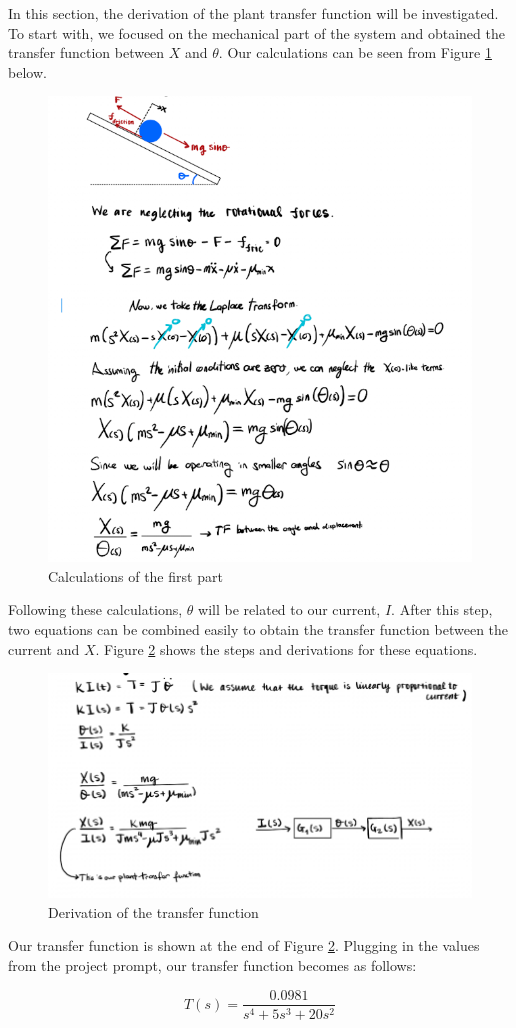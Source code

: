 In this section, the derivation of the plant transfer function will be investigated. To start with, we focused on the mechanical part of the system and obtained the transfer function between $X$ and $\theta$. Our calculations can be seen from Figure \ref{fig:mechanical_transfer} below. \\

\begin{figure}[H]
    \centering
    \includegraphics[width=.9\textwidth]{images/mechanical_transfer.png}
    \caption{Calculations of the first part}
    \label{fig:mechanical_transfer}
\end{figure}

\newpage

Following these calculations, $\theta$ will be related to our current, $I$. After this step, two equations can be combined easily to obtain the transfer function between the current and $X$. Figure \ref{fig:final_transfer} shows the steps and derivations for these equations. 

\begin{figure}[H]
    \centering
    \includegraphics[width=.9\textwidth]{images/second_transfer.png}
    \caption{Derivation of the transfer function}
    \label{fig:final_transfer}
\end{figure}

Our transfer function is shown at the end of Figure \ref{fig:final_transfer}. Plugging in the values from the project prompt, our transfer function becomes as follows:

\begin{equation}
    T(s) = \frac{ 0.0981}{s^4 + 5 s^3 + 20 s^2}
\end{equation}